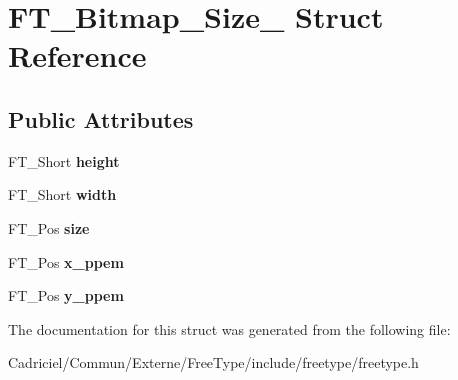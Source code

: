 \hypertarget{struct_f_t___bitmap___size__}{}\section{F\+T\+\_\+\+Bitmap\+\_\+\+Size\+\_\+ Struct Reference}
\label{struct_f_t___bitmap___size__}
\subsection*{Public Attributes}
\begin{DoxyCompactItemize}
\item 
F\+T\+\_\+\+Short {\bfseries height}\hypertarget{struct_f_t___bitmap___size___adf2f24039b458ff4674712886f242262}{}\label{struct_f_t___bitmap___size___adf2f24039b458ff4674712886f242262}

\item 
F\+T\+\_\+\+Short {\bfseries width}\hypertarget{struct_f_t___bitmap___size___ab9da94223f75a89a649d1e6d018b17f1}{}\label{struct_f_t___bitmap___size___ab9da94223f75a89a649d1e6d018b17f1}

\item 
F\+T\+\_\+\+Pos {\bfseries size}\hypertarget{struct_f_t___bitmap___size___a1db23a6220fb6bcb712430821a6e5352}{}\label{struct_f_t___bitmap___size___a1db23a6220fb6bcb712430821a6e5352}

\item 
F\+T\+\_\+\+Pos {\bfseries x\+\_\+ppem}\hypertarget{struct_f_t___bitmap___size___a6f877a792d2dc93328037c928979215f}{}\label{struct_f_t___bitmap___size___a6f877a792d2dc93328037c928979215f}

\item 
F\+T\+\_\+\+Pos {\bfseries y\+\_\+ppem}\hypertarget{struct_f_t___bitmap___size___a60d4d003d09fd57505f69f39e31e19c1}{}\label{struct_f_t___bitmap___size___a60d4d003d09fd57505f69f39e31e19c1}

\end{DoxyCompactItemize}


The documentation for this struct was generated from the following file\+:\begin{DoxyCompactItemize}
\item 
Cadriciel/\+Commun/\+Externe/\+Free\+Type/include/freetype/freetype.\+h\end{DoxyCompactItemize}
